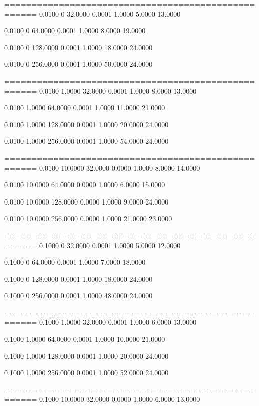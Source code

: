 ====================================================
    0.0100         0   32.0000    0.0001    1.0000    5.0000   13.0000

    0.0100         0   64.0000    0.0001    1.0000    8.0000   19.0000

    0.0100         0  128.0000    0.0001    1.0000   18.0000   24.0000

    0.0100         0  256.0000    0.0001    1.0000   50.0000   24.0000

====================================================
    0.0100    1.0000   32.0000    0.0001    1.0000    8.0000   13.0000

    0.0100    1.0000   64.0000    0.0001    1.0000   11.0000   21.0000

    0.0100    1.0000  128.0000    0.0001    1.0000   20.0000   24.0000

    0.0100    1.0000  256.0000    0.0001    1.0000   54.0000   24.0000

====================================================
    0.0100   10.0000   32.0000    0.0000    1.0000    8.0000   14.0000

    0.0100   10.0000   64.0000    0.0000    1.0000    6.0000   15.0000

    0.0100   10.0000  128.0000    0.0000    1.0000    9.0000   24.0000

    0.0100   10.0000  256.0000    0.0000    1.0000   21.0000   23.0000

====================================================
    0.1000         0   32.0000    0.0001    1.0000    5.0000   12.0000

    0.1000         0   64.0000    0.0001    1.0000    7.0000   18.0000

    0.1000         0  128.0000    0.0001    1.0000   18.0000   24.0000

    0.1000         0  256.0000    0.0001    1.0000   48.0000   24.0000

====================================================
    0.1000    1.0000   32.0000    0.0001    1.0000    6.0000   13.0000

    0.1000    1.0000   64.0000    0.0001    1.0000   10.0000   21.0000

    0.1000    1.0000  128.0000    0.0001    1.0000   20.0000   24.0000

    0.1000    1.0000  256.0000    0.0001    1.0000   52.0000   24.0000

====================================================
    0.1000   10.0000   32.0000    0.0000    1.0000    6.0000   13.0000

